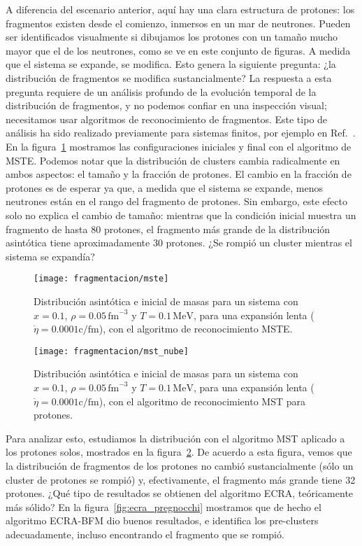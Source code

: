 A diferencia del escenario anterior, aquí hay una clara estructura de protones: los fragmentos existen desde el comienzo, inmersos en un mar de neutrones.
Pueden ser identificados visualmente si dibujamos los protones con un tamaño mucho mayor que el de los neutrones, como se ve en este conjunto de figuras.
A medida que el sistema se expande, se modifica.
Esto genera la siguiente pregunta: ¿la distribución de fragmentos se modifica sustancialmente?
La respuesta a esta pregunta requiere de un análisis profundo de la evolución temporal de la distribución de fragmentos, y no podemos confiar en una inspección visual; necesitamos usar algoritmos de reconocimiento de fragmentos.
Este tipo de análisis ha sido realizado previamente para sistemas finitos, por ejemplo en Ref.~\cite{dorso_fluctuation_1994, strachan_fragment_1997}.
En la figura~\ref{fig:mste_pregnocchi} mostramos las configuraciones iniciales y final con el algoritmo de MSTE.\@
Podemos notar que la distribución de clusters cambia radicalmente en ambos aspectos: el tamaño y la fracción de protones.
El cambio en la fracción de protones es de esperar ya que, a medida que el sistema se expande, menos neutrones están en el rango del fragmento de protones.
Sin embargo, este efecto solo no explica el cambio de tamaño: mientras que la condición inicial muestra un fragmento de hasta 80 protones, el fragmento más grande de la distribución asintótica tiene aproximadamente 30 protones.
¿Se rompió un cluster mientras el sistema se expandía?

\begin{figure}
  \texttt{[image: fragmentacion/mste]}
  \caption{Distribución asintótica e inicial de masas para un sistema con $x = 0.1$, $\rho = 0.05\,\text{fm}^{-3}$ y $T = 0.1\,\text{MeV}$, para una expansión lenta ($\dot{\eta} = 0.0001\text{c/fm}$), con el algoritmo de reconocimiento MSTE.}
\label{fig:mste_pregnocchi}
\end{figure}

\begin{figure}
  \texttt{[image: fragmentacion/mst\_nube]}
  \caption{Distribución asintótica e inicial de masas para un sistema con $x = 0.1$, $\rho = 0.05\,\text{fm}^{-3}$ y $T = 0.1\,\text{MeV}$, para una expansión lenta ($\dot{\eta} = 0.0001\text{c/fm}$), con el algoritmo de reconocimiento MST para protones.}
\label{fig:mst_pregnocchi}
\end{figure}

Para analizar esto, estudiamos la distribución con el algoritmo MST aplicado a los protones solos, mostrados en la figura~\ref{fig:mst_pregnocchi}.
De acuerdo a esta figura, vemos que la distribución de fragmentos de los protones no cambió sustancialmente (sólo un cluster de protones se rompió) y, efectivamente, el fragmento más grande tiene 32 protones.
¿Qué tipo de resultados se obtienen del algoritmo ECRA, teóricamente más sólido?
En la figura~\ref{fig:ecra_pregnocchi} mostramos que de hecho el algoritmo ECRA-BFM dio buenos resultados, e identifica los pre-clusters adecuadamente, incluso encontrando el fragmento que se rompió.


